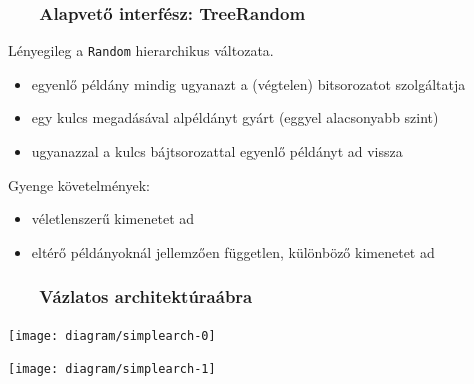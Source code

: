 \documentclass[
]{beamer}
\newcommand{\slidetitle}[2]{\frametitle{{\small #1 ~ \ding{226} ~ } \normalsize \textbf{#2} }}
\begin{document}
\begin{frame}
    \slidetitle{\sectionshorttitle}{Alapvető interfész: TreeRandom}
    
    
    Lényegileg a \texttt{Random} hierarchikus változata.
    
    \vspace{0.2cm}
    
    \begin{itemize}
        \item egyenlő példány mindig ugyanazt a (végtelen) bitsorozatot szolgáltatja
        \item egy kulcs megadásával alpéldányt gyárt (eggyel alacsonyabb szint)
        \item ugyanazzal a kulcs bájtsorozattal egyenlő példányt ad vissza
    \end{itemize}

    \vspace{0.7cm}
    
    Gyenge követelmények:

    \vspace{0.2cm}
    
    \begin{itemize}
        \item véletlenszerű kimenetet ad
        \item eltérő példányoknál jellemzően független, különböző kimenetet ad
    \end{itemize}

\end{frame}

\begin{frame}
    \slidetitle{\sectionshorttitle}{Vázlatos architektúraábra}
    
    \centering
    
    \begin{overprint}
        \centerline{\texttt{[image: diagram/simplearch-0]}}
        \centerline{\texttt{[image: diagram/simplearch-1]}}
    \end{overprint}
\end{frame}
\end{document}
